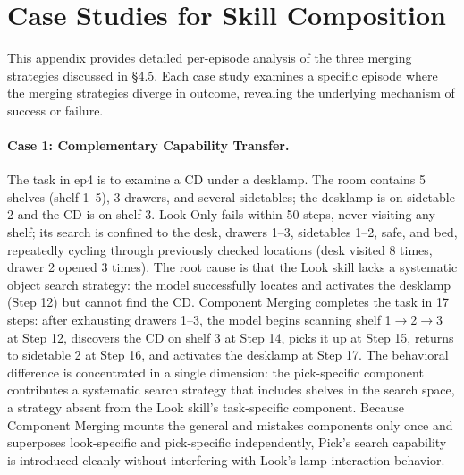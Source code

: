 \section{Case Studies for Skill Composition}
\label{app:case_study}

This appendix provides detailed per-episode analysis of the three merging strategies discussed in \S4.5. Each case study examines a specific episode where the merging strategies diverge in outcome, revealing the underlying mechanism of success or failure.

\paragraph{Case 1: Complementary Capability Transfer.}
The task in ep4 is to examine a CD under a desklamp. The room contains 5 shelves (shelf 1--5), 3 drawers, and several sidetables; the desklamp is on sidetable 2 and the CD is on shelf 3. Look-Only fails within 50 steps, never visiting any shelf; its search is confined to the desk, drawers 1--3, sidetables 1--2, safe, and bed, repeatedly cycling through previously checked locations (desk visited 8 times, drawer 2 opened 3 times). The root cause is that the Look skill lacks a systematic object search strategy: the model successfully locates and activates the desklamp (Step 12) but cannot find the CD. Component Merging completes the task in 17 steps: after exhausting drawers 1--3, the model begins scanning shelf 1$\rightarrow$2$\rightarrow$3 at Step 12, discovers the CD on shelf 3 at Step 14, picks it up at Step 15, returns to sidetable 2 at Step 16, and activates the desklamp at Step 17. The behavioral difference is concentrated in a single dimension: the pick-specific component contributes a systematic search strategy that includes shelves in the search space, a strategy absent from the Look skill's task-specific component. Because Component Merging mounts the general and mistakes components only once and superposes look-specific and pick-specific independently, Pick's search capability is introduced cleanly without interfering with Look's lamp interaction behavior.

